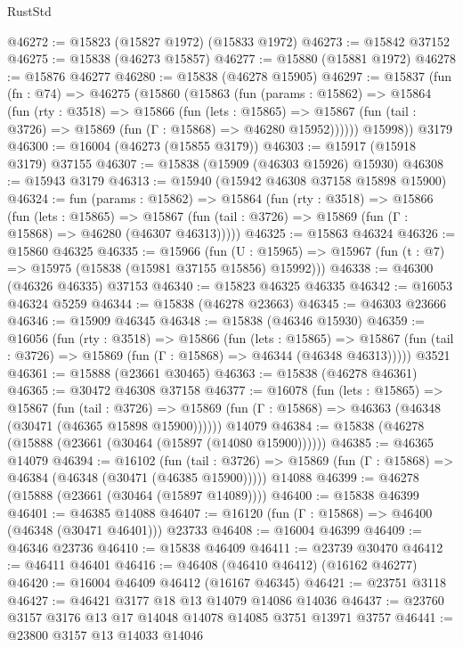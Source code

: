 \begin{lexlean}{RustStd}
\begin{coremodule}
@46272 := @15823 (@15827 @1972) (@15833 @1972)
@46273 := @15842 @37152
@46275 := @15838 (@46273 @15857)
@46277 := @15880 (@15881 @1972)
@46278 := @15876 @46277
@46280 := @15838 (@46278 @15905)
@46297 := @15837
    (fun (fn : @74) =>
    @46275
      (@15860
        (@15863
          (fun (params : @15862) =>
          @15864
            (fun (rty : @3518) =>
            @15866
              (fun (lets : @15865) =>
              @15867 (fun (tail : @3726) => @15869 (fun (Γ : @15868) => @46280 @15952))))))
        @15998))
    @3179
@46300 := @16004 (@46273 (@15855 @3179))
@46303 := @15917 (@15918 @3179) @37155
@46307 := @15838 (@15909 (@46303 @15926) @15930)
@46308 := @15943 @3179
@46313 := @15940 (@15942 @46308 @37158 @15898 @15900)
@46324 := fun (params : @15862) =>
  @15864
    (fun (rty : @3518) =>
    @15866
      (fun (lets : @15865) =>
      @15867 (fun (tail : @3726) => @15869 (fun (Γ : @15868) => @46280 (@46307 @46313)))))
@46325 := @15863 @46324
@46326 := @15860 @46325
@46335 := @15966
    (fun (U : @15965) => @15967 (fun (t : @7) => @15975 (@15838 (@15981 @37155 @15856) @15992)))
@46338 := @46300 (@46326 @46335) @37153
@46340 := @15823 @46325 @46335
@46342 := @16053 @46324 @5259
@46344 := @15838 (@46278 @23663)
@46345 := @46303 @23666
@46346 := @15909 @46345
@46348 := @15838 (@46346 @15930)
@46359 := @16056
    (fun (rty : @3518) =>
    @15866
      (fun (lets : @15865) =>
      @15867 (fun (tail : @3726) => @15869 (fun (Γ : @15868) => @46344 (@46348 @46313)))))
    @3521
@46361 := @15888 (@23661 @30465)
@46363 := @15838 (@46278 @46361)
@46365 := @30472 @46308 @37158
@46377 := @16078
    (fun (lets : @15865) =>
    @15867
      (fun (tail : @3726) =>
      @15869 (fun (Γ : @15868) => @46363 (@46348 (@30471 (@46365 @15898 @15900))))))
    @14079
@46384 := @15838 (@46278 (@15888 (@23661 (@30464 (@15897 (@14080 @15900))))))
@46385 := @46365 @14079
@46394 := @16102
    (fun (tail : @3726) => @15869 (fun (Γ : @15868) => @46384 (@46348 (@30471 (@46385 @15900)))))
    @14088
@46399 := @46278 (@15888 (@23661 (@30464 (@15897 @14089))))
@46400 := @15838 @46399
@46401 := @46385 @14088
@46407 := @16120 (fun (Γ : @15868) => @46400 (@46348 (@30471 @46401))) @23733
@46408 := @16004 @46399
@46409 := @46346 @23736
@46410 := @15838 @46409
@46411 := @23739 @30470
@46412 := @46411 @46401
@46416 := @46408 (@46410 @46412) (@16162 @46277)
@46420 := @16004 @46409 @46412 (@16167 @46345)
@46421 := @23751 @3118
@46427 := @46421 @3177 @18 @13 @14079 @14086 @14036
@46437 := @23760 @3157 @3176 @13 @17 @14048 @14078 @14085 @3751 @13971 @3757
@46441 := @23800 @3157 @13 @14033 @14046

\end{coremodule}
\end{lexlean}
